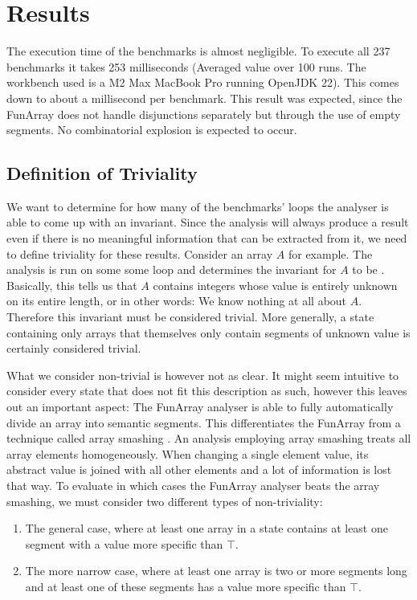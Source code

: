 \section{Results}

The execution time of the benchmarks is almost negligible. To execute all 237 benchmarks it takes 253 milliseconds (Averaged value over 100 runs. The workbench used is a M2 Max MacBook Pro running OpenJDK 22). This comes down to about a millisecond per benchmark. This result was expected, since the FunArray does not handle disjunctions separately but through the use of empty segments. No combinatorial explosion is expected to occur.

\subsection{Definition of Triviality}

We want to determine for how many of the benchmarks' loops the analyser is able to come up with an invariant. Since the analysis will always produce a result even if there is no meaningful information that can be extracted from it, we need to define triviality for these results. Consider an array $A$ for example. The analysis is run on some some loop and determines the invariant for $A$ to be . Basically, this tells us that $A$ contains integers whose value is entirely unknown on its entire length, or in other words: We know nothing at all about $A$. Therefore this invariant must be considered trivial. More generally, a state containing only arrays that themselves only contain segments of unknown value is certainly considered trivial.

What we consider non-trivial is however not as clear. It might seem intuitive to consider every state that does not fit this description as such, however this leaves out an important aspect: The FunArray analyser is able to fully automatically divide an array into semantic segments. This differentiates the FunArray from a technique called array smashing \cite{cousot2011}. An analysis employing array smashing treats all array elements homogeneously. When changing a single element value, its abstract value is joined with all other elements and a lot of information is lost that way. To evaluate in which cases the FunArray analyser beats the array smashing, we must consider two different types of non-triviality:

\begin{enumerate}
	\item The general case, where at least one array in a state contains at least one segment with a value more specific than $\top$.
	\item The more narrow case, where at least one array is two or more segments long and at least one of these segments has a value more specific than $\top$.
\end{enumerate}

